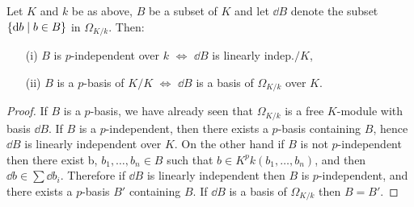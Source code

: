 \documentclass[../main]{subfiles}
\begin{document}
\begin{theorem}
\label{thm:086}
    Let $K$ and $k$ be as above, $B$ be a subset of $K$ and let $\dd{B}$ denote the subset $\left\{\mathrm{d}b \mid b \in B\right\}$ in $\Omega_{K/k}$. Then:
    \begin{enumerate}
    \item[(i)] $B$ is $p$-independent over $k$ $\iff$ $\dd{B}$ is linearly indep.$/K$,
    \item[(ii)] $B$ is a $p$-basis of $K/K$ $\iff$ $\dd{B}$ is a basis of $\Omega_{K/k}$ over $K$.
    \end{enumerate}
\end{theorem}
\begin{proof}
    If $B$ is a $p$-basis, we have already seen that $\Omega_{K/k}$ is a free $K$-module with basis $\dd{B}$. If $B$ is a $p$-independent, then there exists a $p$-basis containing $B$, hence $\dd{B}$ is linearly independent over $K$. On the other hand if $B$ is not $p$-independent then there exist b, $b_1, \dots, b_n \in B$ such that $b \in K^pk(b_1, \dots, b_n)$, and then $\dd{b} \in \sum \dd{b}_i$. Therefore if $\dd{B}$ is linearly independent then $B$ is $p$-independent, and there exists a $p$-basis $B'$ containing $B$. If $\dd{B}$ is a basis of $\Omega_{K/k}$ then $B = B'$. 
\end{proof}
\end{document}
